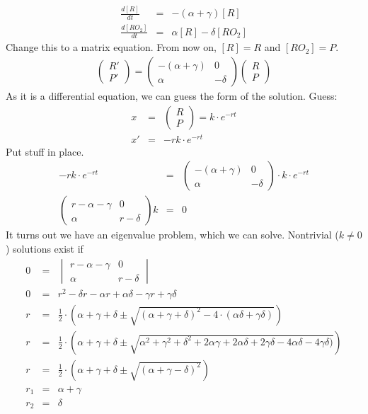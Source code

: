 \documentclass[10pt, a4paper]{article}
\begin{document}
\begin{eqnarray*}
\frac{d[R]}{dt} &=& -(\alpha + \gamma)[R] \\
\frac{d[RO_2]}{dt} &=& \alpha[R] -\delta[RO_2]
\end{eqnarray*}
Change this to a matrix equation. From now on, $[R] = R$ and $[RO_2] = P$. 
\begin{eqnarray*}
\begin{pmatrix}
R' \\
P' 
\end{pmatrix}
= 
\begin{pmatrix}
-(\alpha + \gamma) & 0 \\
\alpha & -\delta 
\end{pmatrix}
\begin{pmatrix}
R \\
P 
\end{pmatrix}
\end{eqnarray*}
As it is a differential equation, we can guess the form of the solution. Guess: 
\begin{eqnarray*}
x &=& 
\begin{pmatrix}
R \\
P 
\end{pmatrix}
= k \cdot e^{-rt} \\
x' &=& -rk \cdot e^{-rt}
\end{eqnarray*}
Put stuff in place. 
\begin{eqnarray*}
-rk \cdot e^{-rt} &=& 
\begin{pmatrix}
-(\alpha + \gamma) & 0 \\
\alpha & -\delta 
\end{pmatrix} 
\cdot k \cdot e^{-rt} \\
\begin{pmatrix}
r -\alpha - \gamma & 0 \\
\alpha & r - \delta 
\end{pmatrix} 
k &=& 0 
\end{eqnarray*}
It turns out we have an eigenvalue problem, which we can solve. Nontrivial ($k \neq 0$) solutions exist if 
\begin{eqnarray*}
0 &=& \begin{vmatrix}
r -\alpha - \gamma & 0 \\
\alpha & r - \delta 
\end{vmatrix} \\
0 &=& r^2 -\delta r - \alpha r + \alpha \delta - \gamma r + \gamma \delta  \\
r &=& \frac{1}{2} \cdot \left( \alpha + \gamma + \delta \pm \sqrt{(\alpha + \gamma + \delta)^2 - 4 \cdot(\alpha \delta + \gamma \delta)} \right)\\
r &=& \frac{1}{2} \cdot \left( \alpha + \gamma + \delta \pm \sqrt{\alpha^2 + \gamma^2 + \delta^2 + 2 \alpha \gamma + 2 \alpha \delta + 2 \gamma \delta - 4\alpha \delta -4\gamma \delta)} \right)\\
r &=& \frac{1}{2} \cdot \left( \alpha + \gamma + \delta \pm \sqrt{(\alpha + \gamma - \delta)^2} \right)\\
r_1 &=& \alpha + \gamma \\
r_2 &=& \delta
\end{eqnarray*}
\end{document}
